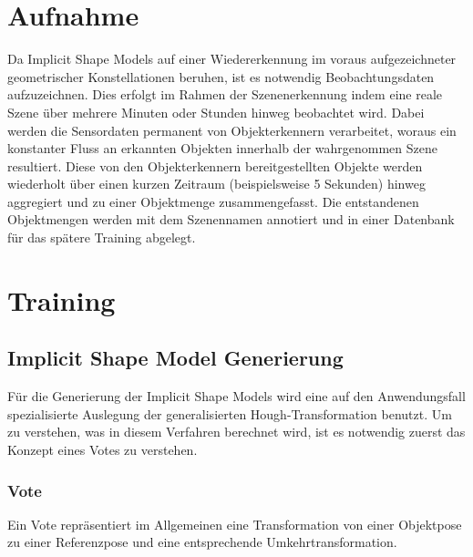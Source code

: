 \section{Aufnahme}

Da Implicit Shape Models auf einer Wiedererkennung im voraus aufgezeichneter geometrischer Konstellationen beruhen, ist es notwendig Beobachtungsdaten aufzuzeichnen.
Dies erfolgt im Rahmen der Szenenerkennung indem eine reale Szene über mehrere Minuten oder Stunden hinweg beobachtet wird.
Dabei werden die Sensordaten permanent von Objekterkennern verarbeitet, woraus ein konstanter Fluss an erkannten Objekten innerhalb der wahrgenommen Szene resultiert.
Diese von den Objekterkennern bereitgestellten Objekte werden wiederholt über einen kurzen Zeitraum (beispielsweise 5 Sekunden) hinweg aggregiert und zu einer Objektmenge zusammengefasst.
Die entstandenen Objektmengen werden mit dem Szenennamen annotiert und in einer Datenbank für das spätere Training abgelegt.

\section{Training}

\subsection{Implicit Shape Model Generierung}

Für die Generierung der Implicit Shape Models wird eine auf den Anwendungsfall spezialisierte Auslegung der generalisierten Hough-Transformation benutzt.
Um zu verstehen, was in diesem Verfahren berechnet wird, ist es notwendig zuerst das Konzept eines Votes zu verstehen.

\subsubsection{Vote}\label{ch:vote}

Ein Vote repräsentiert im Allgemeinen eine Transformation von einer Objektpose zu einer Referenzpose und eine entsprechende Umkehrtransformation.

